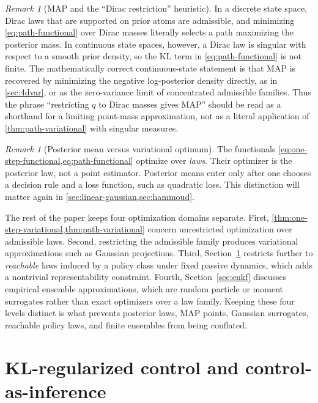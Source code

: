 \documentclass[11pt]{article}
\numberwithin{equation}{section}
\theoremstyle{plain}
\theoremstyle{definition}
\theoremstyle{remark}
\newtheorem{remark}[theorem]{Remark}
\begin{document}
\begin{remark}[MAP and the ``Dirac restriction'' heuristic]
\label{rem:dirac-map}
In a discrete state space, Dirac laws that are supported on prior atoms are admissible, and minimizing \cref{eq:path-functional} over Dirac masses literally selects a path maximizing the posterior mass. In continuous state spaces, however, a Dirac law is singular with respect to a smooth prior density, so the KL term in \cref{eq:path-functional} is not finite. The mathematically correct continuous-state statement is that MAP is recovered by minimizing the negative log-posterior density directly, as in \cref{sec:4dvar}, or as the zero-variance limit of concentrated admissible families. Thus the phrase ``restricting $q$ to Dirac masses gives MAP'' should be read as a shorthand for a limiting point-mass approximation, not as a literal application of \cref{thm:path-variational} with singular measures.
\end{remark}

\begin{remark}[Posterior mean versus variational optimum]
\label{rem:posterior-mean}
The functionals \cref{eq:one-step-functional,eq:path-functional} optimize over \emph{laws}. Their optimizer is the posterior law, not a point estimator. Posterior means enter only after one chooses a decision rule and a loss function, such as quadratic loss. This distinction will matter again in \cref{sec:linear-gaussian,sec:hammoud}.
\end{remark}

The rest of the paper keeps four optimization domains separate. First, \cref{thm:one-step-variational,thm:path-variational} concern unrestricted optimization over admissible laws. Second, restricting the admissible family produces variational approximations such as Gaussian projections. Third, Section~\ref{sec:rl-control} restricts further to \emph{reachable} laws induced by a policy class under fixed passive dynamics, which adds a nontrivial representability constraint. Fourth, Section~\ref{sec:enkf} discusses empirical ensemble approximations, which are random particle or moment surrogates rather than exact optimizers over a law family. Keeping these four levels distinct is what prevents posterior laws, MAP points, Gaussian surrogates, reachable policy laws, and finite ensembles from being conflated.

\section{KL-regularized control and control-as-inference}
\label{sec:rl-control}
\end{document}
